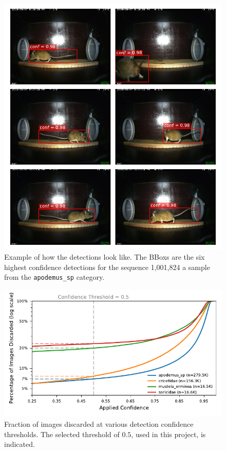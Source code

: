         \begin{figure}[p]
        \centering
        \includegraphics{figures/detections_on_a_sequence.pdf}
        \caption{Example of how the detections look like. The \acsp{BBox} are the six highest confidence detections for the sequence 1,001,824 a sample from the \texttt{apodemus\_sp} category.}
        \label{fig:detection_example}
        \end{figure}

        \begin{figure}[ht]
        \centering
        \includegraphics{figures/discarded_img_by_conf.pdf}
        \caption{
            Fraction of images discarded at various detection confidence thresholds.
            The selected threshold of \(0.5\), used in this project, is indicated.
            }
        \label{fig:lost_images}
        \end{figure}        

